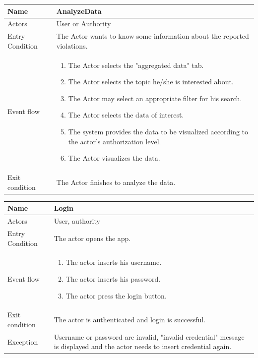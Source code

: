 \vskip 0.2in
\begin{tabular}{|p{3.7cm}|p{11cm}|}
\hline
Name & AnalyzeData\\
\hline
Actors & User or Authority\\
\hline
Entry Condition & The Actor wants to know some information about the reported violations.\\
\hline
Event flow & \begin{enumerate}
                \item The Actor selects the "aggregated data" tab.
                \item The Actor selects the topic he/she is interested about.
                \item The Actor may select an appropriate filter for his search.
                \item The Actor selects the data of interest.
                \item The system provides the data to be visualized according to the actor's authorization level.
                \item The Actor visualizes the data.
            \end{enumerate}\\
\hline
Exit condition & The Actor finishes to analyze the data.\\
\hline
\end{tabular}

\vskip 0.2in
\begin{tabular}{|p{3.7cm}|p{11cm}|}
\hline
Name & Login\\
\hline
Actors & User, authority\\
\hline
Entry Condition & The actor opens the app.\\
\hline
Event flow & \begin{enumerate}
                \item The actor inserts his username.
                \item The actor inserts his password.
                \item The actor press the login button.
            \end{enumerate}\\
\hline
Exit condition & The actor is authenticated and login is successful.\\
\hline
Exception & Username or password are invalid, "invalid credential" message is displayed and the actor needs to insert credential again.\\
\hline
\end{tabular}

